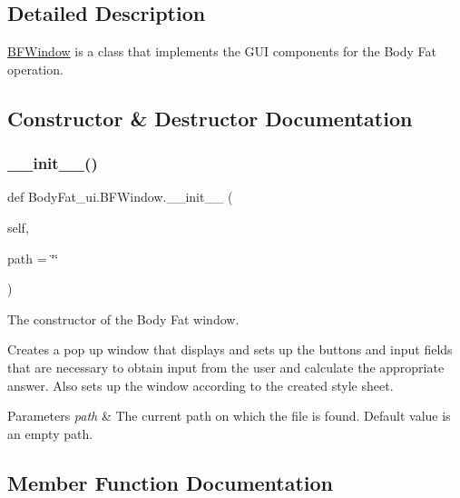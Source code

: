 \subsection{Detailed Description}
\hyperlink{class_body_fat__ui_1_1_b_f_window}{B\+F\+Window} is a class that implements the G\+UI components for the Body Fat operation. 

\subsection{Constructor \& Destructor Documentation}
\mbox{\label{class_body_fat__ui_1_1_b_f_window_a3ee0d136b0b25e045fd9a8a6356819b1}} 
\subsubsection{\texorpdfstring{\+\_\+\+\_\+init\+\_\+\+\_\+()}{\_\_init\_\_()}}
{\footnotesize\ttfamily def Body\+Fat\+\_\+ui.\+B\+F\+Window.\+\_\+\+\_\+init\+\_\+\+\_\+ (\begin{DoxyParamCaption}\item[{}]{self,  }\item[{}]{path = {\ttfamily \char`\"{}\char`\"{}} }\end{DoxyParamCaption})}



The constructor of the Body Fat window. 

Creates a pop up window that displays and sets up the buttons and input fields that are necessary to obtain input from the user and calculate the appropriate answer. Also sets up the window according to the created style sheet. 
\begin{DoxyParams}{Parameters}
{\em path} & The current path on which the file is found. Default value is an empty path. \\
\hline
\end{DoxyParams}


\subsection{Member Function Documentation}
\mbox{\label{class_body_fat__ui_1_1_b_f_window_a1c3b98d97dc41255235c5e739980b16f}} 

